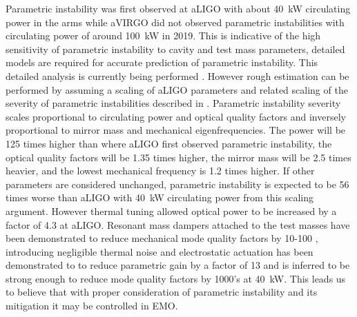 \documentclass[prx,superscriptaddress,twocolumn,nopreprintnumbers,floatfix,nofootinbib]{revtex4}
\begin{document}
Parametric instability was first observed at aLIGO with about 40~kW \cite{Evans2015_PI} circulating power in the arms while aVIRGO did not observed parametric instabilities with circulating power of around 100~kW in 2019. This is indicative of the high sensitivity of parametric instability to cavity and test mass parameters, detailed models are required for accurate prediction of parametric instability.  This detailed analysis is currently being performed \cite{Juntao2020}.  However rough estimation can be performed by assuming a scaling of aLIGO parameters and related scaling of the severity of parametric instabilities described in \cite{Braginsky01}.
Parametric instability severity scales proportional to circulating power and optical quality factors and inversely proportional to mirror mass and mechanical eigenfrequencies.  The power will be 125 times higher than where aLIGO first observed parametric instability, the optical quality factors will be 1.35 times higher, the mirror mass will be 2.5 times heavier, and the lowest mechanical frequency is 1.2 times higher.  If other parameters are considered unchanged, parametric instability is expected to be 56 times worse than aLIGO with 40~kW circulating power from this scaling argument.  However thermal tuning \cite{Zhao_2006_Therm,Hardwick2020_DTC} allowed optical power to be increased by a factor of 4.3 at aLIGO.  Resonant mass dampers attached to the test masses have been demonstrated to reduce mechanical mode quality factors by 10-100 \cite{Biscans2019_AMD}, introducing negligible thermal noise and electrostatic actuation has been demonstrated to to reduce parametric gain by a factor of 13 and is inferred to be strong enough to reduce mode quality factors by 1000’s \cite{Blair_2017_ESDPI} at 40~kW.  This leads us to believe that with proper consideration of parametric instability and its mitigation it may be controlled in EMO.
\end{document}
